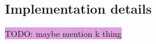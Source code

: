 \documentclass{aa}
\numberwithin{equation}{section}
\numberwithin{table}{section}
\numberwithin{figure}{section}
\begin{document}




\subsection{Implementation details}\label{subsec: III methods}
\colorbox{Plum}{TODO: maybe mention k thing}
\end{document}
